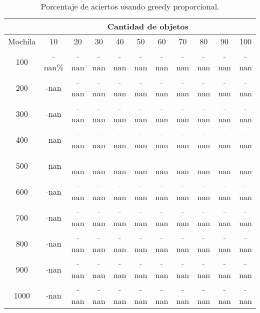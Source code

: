 \documentclass[a4paper]{article}
\begin{document}
\begin{table}[H]
\centering
\relax
\resizebox{\textwidth}{!} {%
\begin{tabular}{|c|c|c|c|c|c|c|c|c|c|c|}
\cline{2-11}
 \multicolumn{1}{c}{} & \multicolumn{10}{|c|}{\textbf{Cantidad de objetos}} \\
\hline
Mochila & 10 & 20 & 30 & 40 & 50 & 60 & 70 & 80 & 90 & 100 \\
\hline
\hline
100 & -nan\% & -nan & -nan & -nan & -nan & -nan & -nan & -nan & -nan & -nan \\
\hline
\hline
200 & -nan & -nan & -nan & -nan & -nan & -nan & -nan & -nan & -nan & -nan \\
\hline
\hline
300 & -nan & -nan & -nan & -nan & -nan & -nan & -nan & -nan & -nan & -nan \\
\hline
\hline
400 & -nan & -nan & -nan & -nan & -nan & -nan & -nan & -nan & -nan & -nan \\
\hline
\hline
500 & -nan & -nan & -nan & -nan & -nan & -nan & -nan & -nan & -nan & -nan \\
\hline
\hline
600 & -nan & -nan & -nan & -nan & -nan & -nan & -nan & -nan & -nan & -nan \\
\hline
\hline
700 & -nan & -nan & -nan & -nan & -nan & -nan & -nan & -nan & -nan & -nan \\
\hline
\hline
800 & -nan & -nan & -nan & -nan & -nan & -nan & -nan & -nan & -nan & -nan \\
\hline
\hline
900 & -nan & -nan & -nan & -nan & -nan & -nan & -nan & -nan & -nan & -nan \\
\hline
\hline
1000 & -nan & -nan & -nan & -nan & -nan & -nan & -nan & -nan & -nan & -nan \\
\hline
\end{tabular}%
}
\caption{Porcentaje de aciertos usando greedy proporcional.}
\end{table}
\end{document}
